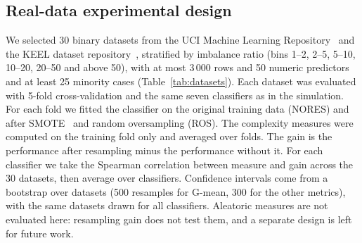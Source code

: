\documentclass[preprint,12pt]{elsarticle}
\begin{document}
\subsection{Real-data experimental design}\label{sec:realdesign}
We selected 30 binary datasets from the UCI Machine Learning Repository~\cite{UCI} and the KEEL dataset repository~\cite{Alcala2011}, stratified by imbalance ratio (bins 1--2, 2--5, 5--10, 10--20, 20--50 and above 50), with at most 3\,000 rows and 50 numeric predictors and at least 25 minority cases (Table~\ref{tab:datasets}). Each dataset was evaluated with 5-fold cross-validation and the same seven classifiers as in the simulation. For each fold we fitted the classifier on the original training data (NORES) and after SMOTE~\cite{Chawla2002} and random oversampling (ROS). The complexity measures were computed on the training fold only and averaged over folds. The gain is the performance after resampling minus the performance without it. For each classifier we take the Spearman correlation between measure and gain across the 30 datasets, then average over classifiers. Confidence intervals come from a bootstrap over datasets (500 resamples for G-mean, 300 for the other metrics), with the same datasets drawn for all classifiers. Aleatoric measures are not evaluated here: resampling gain does not test them, and a separate design is left for future work.
\end{document}
